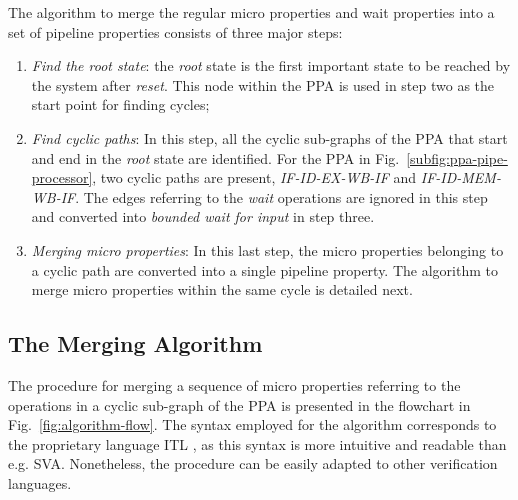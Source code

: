 The algorithm to merge the regular micro properties and wait properties into a set of pipeline properties consists of three major steps:

\begin{enumerate}
\item \textit{Find the root state}: the \textit{root} state is the first important state to be reached by the system after \textit{reset}. This node within the PPA is used in step two as the start point for finding cycles;
\item \textit{Find cyclic paths}: In this step, all the cyclic sub-graphs of the PPA that start and end in the \textit{root} state are identified. For the PPA in Fig.~\ref{subfig:ppa-pipe-processor}, two cyclic paths are present, \textit{IF-ID-EX-WB-IF} and \textit{IF-ID-MEM-WB-IF}. The edges referring to the \textit{wait} operations are ignored in this step and converted into \textit{bounded wait for input} in step three.
\item \textit{Merging micro properties}: In this last step, the micro properties belonging to a cyclic path are converted into a single pipeline property. The algorithm to merge micro properties within the same cycle is detailed next. 
\end{enumerate}

\subsection*{The Merging Algorithm}

The procedure for merging a sequence of micro properties referring to the operations in a cyclic sub-graph of the PPA is presented in the flowchart in Fig.~\ref{fig:algorithm-flow}. The syntax employed for the algorithm corresponds to the proprietary language ITL \cite{onespin}, as this syntax is more intuitive and readable than e.g. SVA. Nonetheless, the procedure can be easily adapted to other verification languages. 

